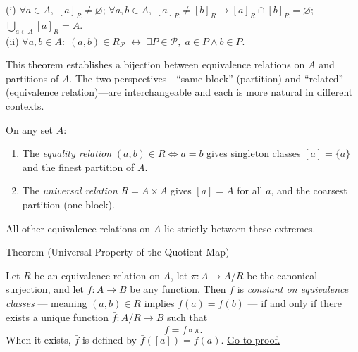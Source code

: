 \begin{remark*}
(i) $\forall a \in A,\; [a]_R \neq \varnothing$; $\forall a,b \in A,\; [a]_R \neq [b]_R \to [a]_R \cap [b]_R = \varnothing$; $\bigcup_{a \in A}[a]_R = A$.\\
(ii) $\forall a,b \in A:\; (a,b) \in R_{\mathcal{P}} \;\leftrightarrow\; \exists P \in \mathcal{P},\; a \in P \wedge b \in P$.
\end{remark*}
\begin{remark*}
This theorem establishes a bijection between equivalence relations on $A$
and partitions of $A$. The two perspectives---``same block'' (partition) and
``related'' (equivalence relation)---are interchangeable and each is more
natural in different contexts.
\end{remark*}

\begin{example*}
On any set $A$:
\begin{enumerate}
\item The \emph{equality relation} $(a,b) \in R \iff a=b$ gives singleton
classes $[a] = \{a\}$ and the finest partition of $A$.
\item The \emph{universal relation} $R = A \times A$ gives $[a] = A$ for all
$a$, and the coarsest partition (one block).
\end{enumerate}
All other equivalence relations on $A$ lie strictly between these extremes.
\end{example*}


\begin{theorembox}{Theorem (Universal Property of the Quotient Map)}
\begin{theorem}
\label{thm:quotient-universal}
Let $R$ be an equivalence relation on $A$, let $\pi : A \to A/R$ be the
canonical surjection, and let $f : A \to B$ be any function. Then $f$ is
\emph{constant on equivalence classes} — meaning $(a,b) \in R$ implies
$f(a) = f(b)$ — if and only if there exists a unique function
$\bar{f} : A/R \to B$ such that
\[
f = \bar{f} \circ \pi.
\]
When it exists, $\bar{f}$ is defined by $\bar{f}([a]) = f(a)$.
\hyperref[prf:quotient-universal]{Go to proof.}
\end{theorem}
\end{theorembox}

